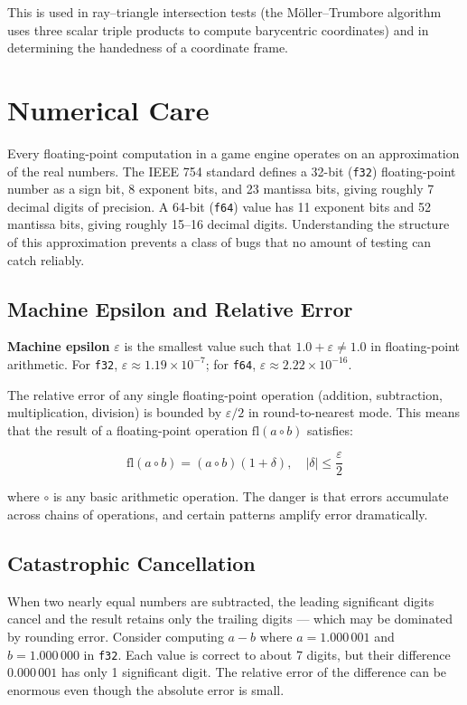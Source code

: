 \documentclass[
  11pt,
  letterpaper,
  DIV=11,
  numbers=noendperiod,
  twoside,
  open=right]{scrreprt}
\begin{document}
This is used in ray--triangle intersection tests (the Möller--Trumbore
algorithm uses three scalar triple products to compute barycentric
coordinates) and in determining the handedness of a coordinate frame.

\section{Numerical Care}\label{numerical-care}

Every floating-point computation in a game engine operates on an
approximation of the real numbers. The IEEE 754 standard defines a
32-bit (\texttt{f32}) floating-point number as a sign bit, 8 exponent
bits, and 23 mantissa bits, giving roughly 7 decimal digits of
precision. A 64-bit (\texttt{f64}) value has 11 exponent bits and 52
mantissa bits, giving roughly 15--16 decimal digits. Understanding the
structure of this approximation prevents a class of bugs that no amount
of testing can catch reliably.

\subsection{Machine Epsilon and Relative
Error}\label{machine-epsilon-and-relative-error}

\textbf{Machine epsilon} \(\varepsilon\) is the smallest value such that
\(1.0 + \varepsilon \neq 1.0\) in floating-point arithmetic. For
\texttt{f32}, \(\varepsilon \approx 1.19 \times 10^{-7}\); for
\texttt{f64}, \(\varepsilon \approx 2.22 \times 10^{-16}\).

The relative error of any single floating-point operation (addition,
subtraction, multiplication, division) is bounded by \(\varepsilon / 2\)
in round-to-nearest mode. This means that the result of a floating-point
operation \(\text{fl}(a \circ b)\) satisfies:

\[
\text{fl}(a \circ b) = (a \circ b)(1 + \delta), \quad |\delta| \leq \frac{\varepsilon}{2}
\]

where \(\circ\) is any basic arithmetic operation. The danger is that
errors accumulate across chains of operations, and certain patterns
amplify error dramatically.

\subsection{Catastrophic Cancellation}\label{catastrophic-cancellation}

When two nearly equal numbers are subtracted, the leading significant
digits cancel and the result retains only the trailing digits --- which
may be dominated by rounding error. Consider computing \(a - b\) where
\(a = 1.000\,001\) and \(b = 1.000\,000\) in \texttt{f32}. Each value is
correct to about 7 digits, but their difference \(0.000\,001\) has only
1 significant digit. The relative error of the difference can be
enormous even though the absolute error is small.
\end{document}
